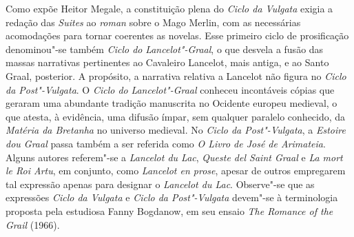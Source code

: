 Como expõe Heitor Megale, a constituição plena do \textit{Ciclo da Vulgata}
exigia a redação das \textit{Suites} ao \textit{roman} sobre o Mago Merlin, com
as necessárias acomodações para tornar coerentes as novelas. Esse primeiro
ciclo de prosificação denominou"-se também \textit{Ciclo do}
\textit{Lancelot"-Graal}, o que desvela a fusão das massas narrativas
pertinentes ao Cavaleiro Lancelot, mais antiga, e ao Santo Graal, posterior. A
propósito, a narrativa relativa a Lancelot não figura no \textit{Ciclo da
Post"-Vulgata}. O \textit{Ciclo do} \textit{Lancelot"-Graal} conheceu incontáveis
cópias que geraram uma abundante tradição manuscrita no Ocidente europeu
medieval, o que atesta, à evidência, uma difusão ímpar, sem qualquer paralelo
conhecido, da \textit{Matéria da Bretanha }no universo medieval. No
\textit{Ciclo da Post"-Vulgata}, a \textit{Estoire dou Graal} passa também a ser
referida como \textit{O Livro de José de Arimateia}. Alguns autores referem"-se
a \textit{Lancelot du Lac}, \textit{Queste del Saint Graal} e  \textit{La mort
le Roi Artu}, em conjunto, como \textit{Lancelot en prose}, apesar de outros
empregarem tal expressão apenas para designar o \textit{Lancelot du Lac}.
Observe"-se que as expressões \textit{Ciclo da Vulgata} e \textit{Ciclo da
Post"-Vulgata} devem"-se à terminologia proposta pela estudiosa Fanny Bogdanow,
em seu ensaio \textit{The Romance of the Grail }(1966). 

